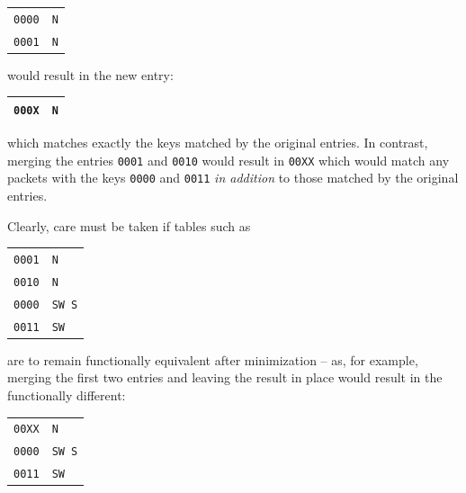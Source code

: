 \documentclass[conference]{IEEEtran}
\newcommand{\mytt}[1]{\texttt{\footnotesize#1}}
\begin{document}
  \begin{table}[H]
    \centering
    \begin{tabular}{c l}
      \toprule
      \texttt{0000} & \texttt{N}\\
      \texttt{0001} & \texttt{N}\\
      \bottomrule
    \end{tabular}
  \end{table}

  \noindent would result in the new entry:

  \begin{table}[H]
    \centering
    \begin{tabular}{c l}
      \toprule
      \texttt{000X} & \texttt{N}\\
      \bottomrule
    \end{tabular}
  \end{table}

  \noindent which matches exactly the keys matched by the original entries.
  In contrast, merging the entries \mytt{0001} and \mytt{0010} would result in \mytt{00XX} which would match any packets with the keys \mytt{0000} and \mytt{0011} \textit{in addition} to those matched by the original entries.

  Clearly, care must be taken if tables such as

  \begin{table}[H]
    \centering
    \begin{tabular}{c l}
      \toprule
      \texttt{0001} & \texttt{N}\\
      \texttt{0010} & \texttt{N}\\
      \texttt{0000} & \texttt{SW S}\\
      \texttt{0011} & \texttt{SW}\\
      \bottomrule
    \end{tabular}
  \end{table}

  \noindent are to remain functionally equivalent after minimization -- as, for example, merging the first two entries and leaving the result in place would result in the functionally different:

  \begin{table}[H]
    \centering
    \begin{tabular}{c l}
      \toprule
      \texttt{00XX} & \texttt{N}\\
      \texttt{0000} & \texttt{SW S}\\
      \texttt{0011} & \texttt{SW}\\
      \bottomrule
    \end{tabular}
  \end{table}
\end{document}
